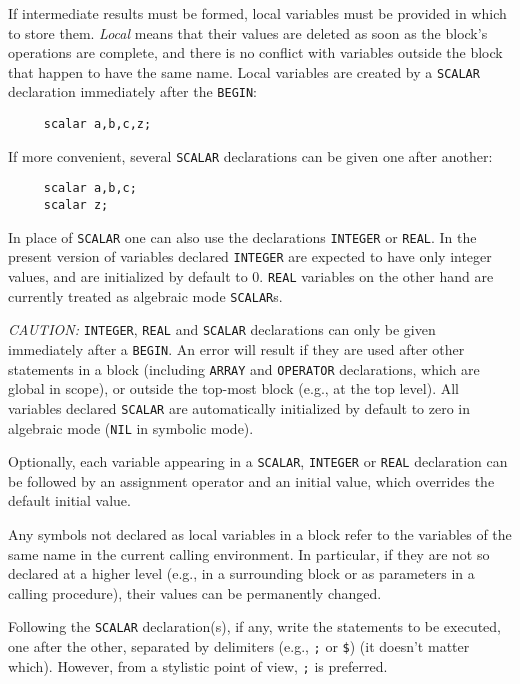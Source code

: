 \hypertarget{command:SCALAR}{}
\hypertarget{command:INTEGER}{}
\hypertarget{command:REAL}{}

If intermediate results must be formed, local variables must be provided
in which to store them. \emph{Local} means that their values are deleted as
soon as the block's operations are complete, and there is no conflict with
variables outside the block that happen to have the same name.  Local
variables are created by a \texttt{SCALAR} declaration
immediately after the \texttt{BEGIN}:
\begin{verbatim}
     scalar a,b,c,z;
\end{verbatim}
If more convenient, several \texttt{SCALAR} declarations can be given one after
another:
\begin{verbatim}
     scalar a,b,c;
     scalar z;
\end{verbatim}
In place of \texttt{SCALAR} one can also use the declarations
\texttt{INTEGER} or \texttt{REAL}.
In the present version of {\REDUCE} variables declared \texttt{INTEGER}
are expected to have only integer values, and are initialized by default to 0.
\texttt{REAL} variables on the other hand are currently treated as algebraic
mode \texttt{SCALAR}s.

\textit{CAUTION:} \texttt{INTEGER}, \texttt{REAL} and \texttt{SCALAR} declarations can
only be given immediately after a \texttt{BEGIN}.  An error will result if
they are used after other statements in a block (including \texttt{ARRAY} and
\texttt{OPERATOR} declarations, which are global in scope), or outside the
top-most block (e.g., at the top level).  All variables declared
\texttt{SCALAR} are automatically initialized by default to zero in algebraic mode
(\texttt{NIL} in symbolic mode).

Optionally, each variable appearing in a \texttt{SCALAR},
\texttt{INTEGER} or \texttt{REAL} declaration can be followed by an
assignment operator and an initial value, which overrides the default
initial value.

Any symbols not declared as local variables in a block refer to the
variables of the same name in the current calling environment. In
particular, if they are not so declared at a higher level (e.g., in a
surrounding block or as parameters in a calling procedure), their values can
be permanently changed.

Following the \texttt{SCALAR} declaration(s), if any, write the
statements to be executed, one after the other, separated by delimiters
(e.g., \texttt{;} or \texttt{\$}) (it doesn't matter which).  However, from a
stylistic point of view, \texttt{;} is preferred.

